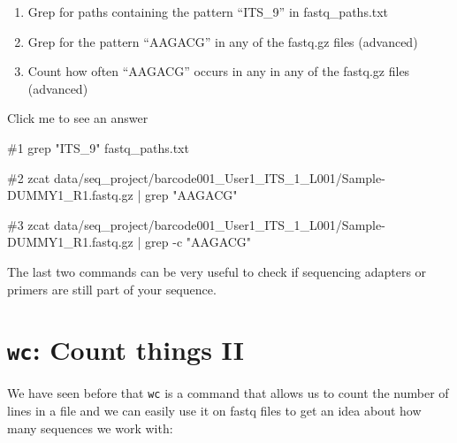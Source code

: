 \documentclass[
  letterpaper,
  DIV=11,
  numbers=noendperiod]{scrreprt}
\newenvironment{Shaded}{}{}
\newcommand{\AttributeTok}[1]{\textcolor[rgb]{0.84,0.23,0.29}{#1}}
\newcommand{\CommentTok}[1]{\textcolor[rgb]{0.42,0.45,0.49}{#1}}
\newcommand{\FunctionTok}[1]{\textcolor[rgb]{0.44,0.26,0.76}{#1}}
\newcommand{\KeywordTok}[1]{\textcolor[rgb]{0.84,0.23,0.29}{#1}}
\newcommand{\NormalTok}[1]{\textcolor[rgb]{0.14,0.16,0.18}{#1}}
\newcommand{\StringTok}[1]{\textcolor[rgb]{0.01,0.18,0.38}{#1}}
\providecommand{\tightlist}{%
  \setlength{\itemsep}{0pt}\setlength{\parskip}{0pt}}\usepackage{longtable,booktabs,array}
\begin{document}
\begin{tcolorbox}[enhanced jigsaw, title=\textcolor{quarto-callout-caution-color}{\faFire}\hspace{0.5em}{Exercise}, colframe=quarto-callout-caution-color-frame, opacitybacktitle=0.6, rightrule=.15mm, arc=.35mm, left=2mm, colbacktitle=quarto-callout-caution-color!10!white, bottomrule=.15mm, leftrule=.75mm, toprule=.15mm, opacityback=0, bottomtitle=1mm, colback=white, toptitle=1mm, breakable, titlerule=0mm, coltitle=black]

\begin{enumerate}
\def\labelenumi{\arabic{enumi}.}
\tightlist
\item
  Grep for paths containing the pattern ``ITS\_9'' in fastq\_paths.txt
\item
  Grep for the pattern ``AAGACG'' in any of the fastq.gz files
  (advanced)
\item
  Count how often ``AAGACG'' occurs in any in any of the fastq.gz files
  (advanced)
\end{enumerate}

Click me to see an answer

\begin{Shaded}
\begin{Highlighting}[]
\CommentTok{\#1}
\FunctionTok{grep} \StringTok{"ITS\_9"}\NormalTok{ fastq\_paths.txt}

\CommentTok{\#2}
\FunctionTok{zcat}\NormalTok{ data/seq\_project/barcode001\_User1\_ITS\_1\_L001/Sample{-}DUMMY1\_R1.fastq.gz }\KeywordTok{|} \FunctionTok{grep} \StringTok{"AAGACG"}

\CommentTok{\#3}
\FunctionTok{zcat}\NormalTok{ data/seq\_project/barcode001\_User1\_ITS\_1\_L001/Sample{-}DUMMY1\_R1.fastq.gz }\KeywordTok{|} \FunctionTok{grep} \AttributeTok{{-}c} \StringTok{"AAGACG"}
\end{Highlighting}
\end{Shaded}

The last two commands can be very useful to check if sequencing adapters
or primers are still part of your sequence.

\end{tcolorbox}

\section{\texorpdfstring{\texttt{wc}: Count things
II}{wc: Count things II}}\label{wc-count-things-ii}

We have seen before that \texttt{wc} is a command that allows us to
count the number of lines in a file and we can easily use it on fastq
files to get an idea about how many sequences we work with:
\end{document}
